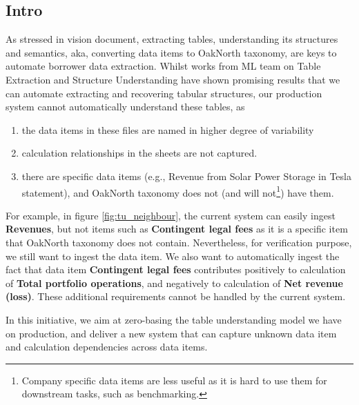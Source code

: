 \documentclass[]{article}
\begin{document}
\subsection{Intro}
As stressed in vision document, extracting 
tables, understanding its structures and semantics, aka, converting data items 
to OakNorth taxonomy, are keys to automate 
borrower data extraction. Whilst works from ML team on Table Extraction and 
Structure Understanding have shown promising results that we can automate 
extracting and recovering tabular structures, our production system cannot 
automatically understand these tables, as 
\begin{enumerate}
    \item the data items in these files are named in higher degree of 
    variability
    \item calculation relationships in the sheets are not 
    captured.
    \item there are specific data items (e.g., Revenue from Solar Power 
    Storage in Tesla statement), and OakNorth taxonomy does not (and will 
    not\footnote{Company specific data items are less useful as it is hard to 
    use them for downstream tasks, such as benchmarking.}) have them.
\end{enumerate}

For example, in figure \ref{fig:tu_neighbour}, the current system can easily 
ingest \textbf{Revenues}, but not items such as \textbf{Contingent legal fees} 
as it is a 
specific item that OakNorth taxonomy does not contain. Nevertheless, for 
verification purpose, we still want to ingest the data item. We also want to 
automatically ingest the fact that data item \textbf{Contingent legal 
fees} contributes positively to calculation of \textbf{Total portfolio 
operations}, and negatively to calculation of \textbf{Net revenue (loss)}. 
These additional requirements cannot be handled by the current system.

In this initiative, we aim at zero-basing the table understanding model we have 
on production, and deliver a new system that can capture unknown data item and 
calculation dependencies across data items.  
\end{document}
